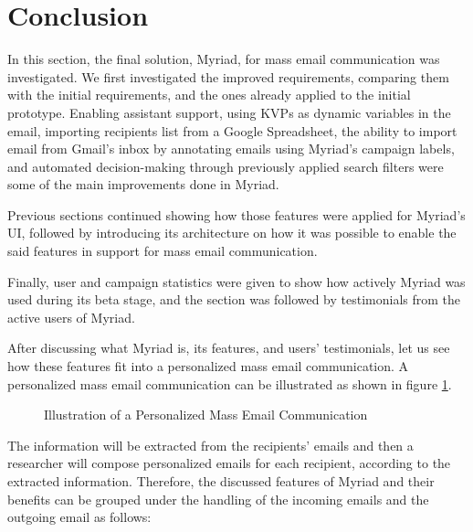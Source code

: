 \section{Conclusion}
\label{sec:5.5:Conc}

In this section, the final solution, Myriad, for mass email communication was investigated. We first investigated the improved requirements, comparing them with the initial requirements, and the ones already applied to the initial prototype. Enabling assistant support, using \ac{KVP}s as dynamic variables in the email, importing recipients list from a Google Spreadsheet, the ability to import email from Gmail's inbox by annotating emails using Myriad's campaign labels, and automated decision-making through previously applied search filters were some of the main improvements done in Myriad.
\vspace{1cm}

Previous sections continued showing how those features were applied for Myriad's \ac{UI}, followed by introducing its architecture on how it was possible to enable the said features in support for mass email communication.
\vspace{1cm}

Finally, user and campaign statistics were given to show how actively Myriad was used during its beta stage, and the section was followed by testimonials from the active users of Myriad.
\vspace{1cm}

After discussing what Myriad is, its features, and users' testimonials, let us see how these features fit into a personalized mass email communication. A personalized mass email communication can be illustrated as shown in figure \ref{fig:drawingStatesOfEmailCommunication}.

\begin{figure}[htbp]
	\centering
	\begin{pdfpic}
	    
	\end{pdfpic}
	\caption[Illustration of a Personalized Mass Email Communication]{Illustration of a Personalized Mass Email Communication}
	\label{fig:drawingStatesOfEmailCommunication}
\end{figure}

The information will be extracted from the recipients' emails and then a researcher will compose personalized emails for each recipient, according to the extracted information. Therefore, the discussed features of Myriad and their benefits can be grouped under the handling of the incoming emails and the outgoing email as follows:
\vspace{1cm}

